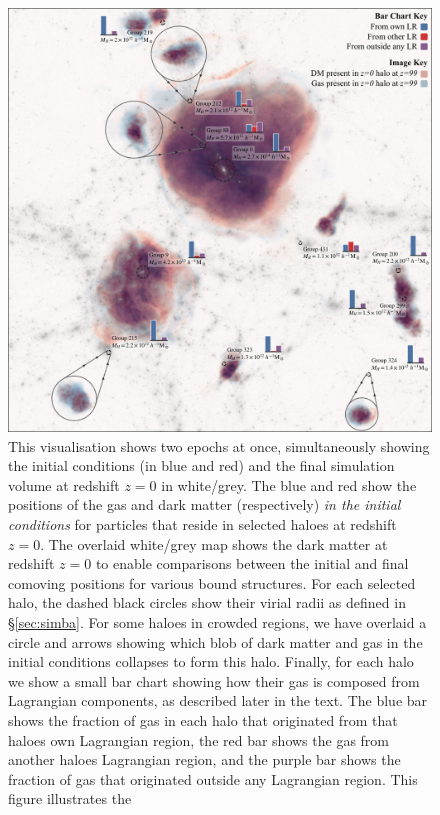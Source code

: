 \begin{figure}
	\centering
	\vspace{0.5cm}
	\includegraphics{figures/fancy-figure-updated.pdf}
 \caption{ This visualisation shows two epochs at once, simultaneously
 showing the initial conditions (in blue and red) and the final simulation
 volume at redshift $z=0$ in white/grey. The blue and red show the positions
 of the gas and dark matter (respectively) \emph{in the initial conditions}
 for particles that reside in selected haloes at redshift $z=0$. The overlaid
 white/grey map shows the dark matter at redshift $z=0$ to enable comparisons
 between the initial and final comoving positions for various bound
 structures. For each selected halo, the dashed black circles show their
 virial radii as defined in \S \ref{sec:simba}. For some haloes in crowded
 regions, we have overlaid a circle and arrows showing which blob of dark
 matter and gas in the initial conditions collapses to form this halo.
 Finally, for each halo we show a small bar chart showing how their gas is
 composed from Lagrangian components, as described later in the text. The
 blue bar shows the fraction of gas in each halo that originated from that
 haloes own Lagrangian region, the red bar shows the gas from another haloes
 Lagrangian region, and the purple bar shows the fraction of gas that
 originated outside any Lagrangian region. This figure illustrates the
}
\end{figure}
